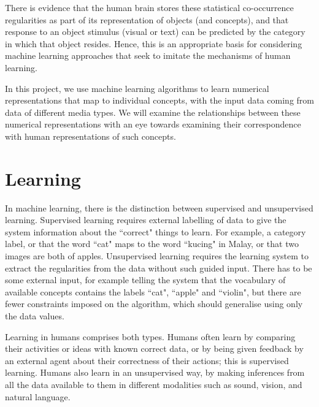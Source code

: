 There is evidence \cite{CoocurrenceVisionLanguage2021} that the human brain stores these statistical co-occurrence regularities  as part of its representation of objects (and concepts), and that response to an object stimulus (visual or text) can be predicted by the category in which that object resides. Hence, this is an appropriate basis for considering machine learning approaches that seek to imitate the mechanisms of human learning. 

In this project, we use machine learning algorithms to learn numerical representations that map to individual concepts, with the input data coming from data of different media types. We will examine the relationships between these numerical representations with an eye towards examining their correspondence with human representations of such concepts. 




\section{Learning}
In machine learning, there is the distinction between supervised and unsupervised learning. Supervised learning requires external labelling of data to give the system information about the ``correct" things to learn. For example, a category label, or that the word ``cat" maps to the word ``kucing" in Malay, or that two images are both of apples. Unsupervised learning requires the learning system to extract the regularities from the data without such guided input. There has to be some external input, for example telling the system that the vocabulary of available concepts contains the labels ``cat", ``apple" and ``violin", but there are fewer constraints imposed on the algorithm, which should generalise using only the data values. 

Learning in humans comprises both types. Humans often learn by comparing their activities or ideas with known correct data, or by being given feedback by an external agent about their correctness of their actions; this is supervised learning. Humans also learn in an unsupervised way, by making inferences from all the data available to them in different modalities such as sound, vision, and natural language. 

